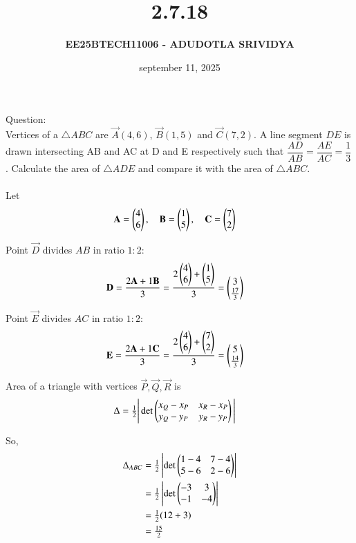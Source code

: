 \documentclass[journal]{IEEEtran}
\title{\textbf{2.7.18}}
\author{\textbf{EE25BTECH11006 - ADUDOTLA SRIVIDYA}}
\date{september 11, 2025}
\begin{document}
\maketitle

Question:\\
Vertices of a $\triangle ABC$ are $\vec{A}(4,6)$, $\vec{B}(1,5)$ and $\vec{C}(7,2)$.  
A line segment $DE$ is drawn intersecting AB and AC at D and E respectively such that  
$\dfrac{AD}{AB} = \dfrac{AE}{AC} = \dfrac{1}{3}$.  
Calculate the area of $\triangle ADE$ and compare it with the area of $\triangle ABC$.\\

\solution\\
Let
\begin{align}
    \mathbf{A} &= \begin{pmatrix}4\\6\end{pmatrix}, \quad
    \mathbf{B} = \begin{pmatrix}1\\5\end{pmatrix}, \quad
    \mathbf{C} = \begin{pmatrix}7\\2\end{pmatrix}
\end{align}

Point $\vec{D}$ divides $AB$ in ratio $1:2$:
\begin{align}
    \mathbf{D} &= \frac{2\mathbf{A} + 1\mathbf{B}}{3} 
             = \frac{2\begin{pmatrix}4\\6\end{pmatrix} + \begin{pmatrix}1\\5\end{pmatrix}}{3} 
             = \begin{pmatrix}3\\\tfrac{17}{3}\end{pmatrix}
\end{align}

Point $\vec{E}$ divides $AC$ in ratio $1:2$:
\begin{align}
    \mathbf{E} &= \frac{2\mathbf{A} + 1\mathbf{C}}{3} 
             = \frac{2\begin{pmatrix}4\\6\end{pmatrix} + \begin{pmatrix}7\\2\end{pmatrix}}{3} 
             = \begin{pmatrix}5\\\tfrac{14}{3}\end{pmatrix}
\end{align}

Area of a triangle with vertices $\vec{P}, \vec{Q}, \vec{R}$ is
\begin{align}
    \Delta &= \tfrac{1}{2}\Bigg|\det \begin{pmatrix}x_Q - x_P & x_R - x_P \\ y_Q - y_P & y_R - y_P\end{pmatrix}\Bigg|
\end{align}

So,
\begin{align}
    \Delta_{ABC} &= \tfrac{1}{2}\left|\det \begin{pmatrix}1-4 & 7-4 \\ 5-6 & 2-6\end{pmatrix}\right| \\
                 &= \tfrac{1}{2}\left|\det \begin{pmatrix}-3 & 3 \\ -1 & -4\end{pmatrix}\right| \\
                 &= \tfrac{1}{2}(12+3) \\
                 &= \tfrac{15}{2}
\end{align}
\end{document}
